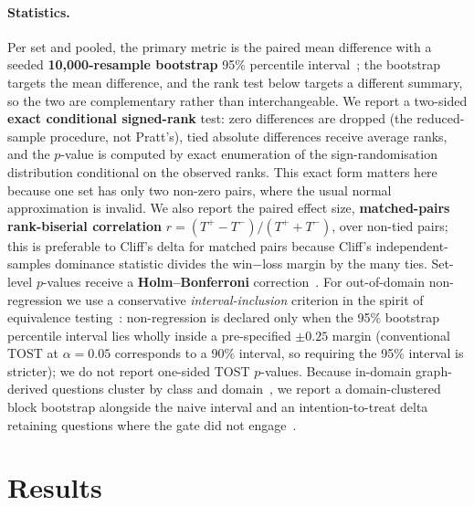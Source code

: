 \documentclass[10pt,twocolumn]{article}
\begin{document}
\paragraph{Statistics.} Per set and pooled, the primary metric is the paired mean difference with a seeded \textbf{10{,}000-resample bootstrap} 95\% percentile interval~\cite{efron1979bootstrap,koehn2004significance}; the bootstrap targets the mean difference, and the rank test below targets a different summary, so the two are complementary rather than interchangeable. We report a two-sided \textbf{exact conditional signed-rank} test: zero differences are dropped (the reduced-sample procedure, not Pratt's), tied absolute differences receive average ranks, and the $p$-value is computed by exact enumeration of the sign-randomisation distribution conditional on the observed ranks. This exact form matters here because one set has only two non-zero pairs, where the usual normal approximation is invalid. We also report the paired effect size, \textbf{matched-pairs rank-biserial correlation} $r=(T^{+}-T^{-})/(T^{+}+T^{-})$, over non-tied pairs; this is preferable to Cliff's delta for matched pairs because Cliff's independent-samples dominance statistic divides the win$-$loss margin by the many ties. Set-level $p$-values receive a \textbf{Holm--Bonferroni} correction~\cite{dror2018hitchhiker}. For out-of-domain non-regression we use a conservative \emph{interval-inclusion} criterion in the spirit of equivalence testing~\cite{lakens2017equivalence}: non-regression is declared only when the 95\% bootstrap percentile interval lies wholly inside a pre-specified $\pm0.25$ margin (conventional TOST at $\alpha=0.05$ corresponds to a 90\% interval, so requiring the 95\% interval is stricter); we do not report one-sided TOST $p$-values. Because in-domain graph-derived questions cluster by class and domain~\cite{dror2018hitchhiker}, we report a domain-clustered block bootstrap alongside the naive interval and an intention-to-treat delta retaining questions where the gate did not engage~\cite{hollis1999itt}.


\section{Results}\label{sec:results}
\end{document}
